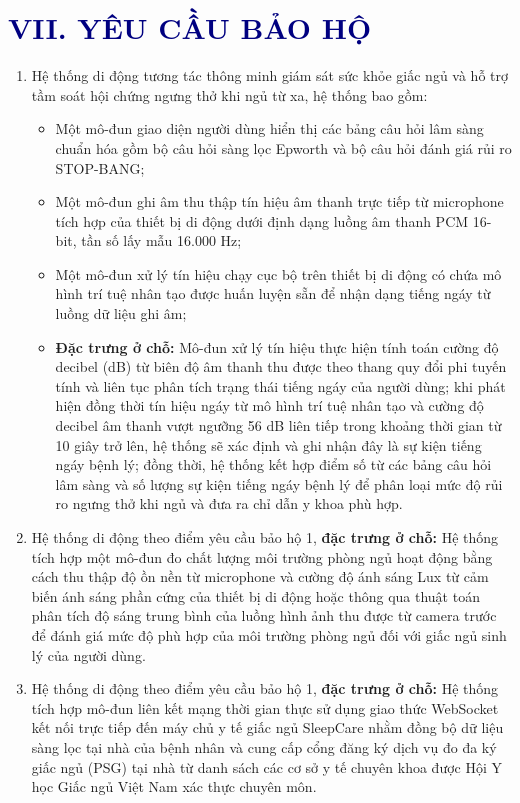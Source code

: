 \documentclass[12pt,a4paper]{article}
\begin{document}
\section{\textcolor{navy}{VII. YÊU CẦU BẢO HỘ}}

\begin{enumerate}
    \item Hệ thống di động tương tác thông minh giám sát sức khỏe giấc ngủ và hỗ trợ tầm soát hội chứng ngưng thở khi ngủ từ xa, hệ thống bao gồm:
    \begin{itemize}
        \item Một mô-đun giao diện người dùng hiển thị các bảng câu hỏi lâm sàng chuẩn hóa gồm bộ câu hỏi sàng lọc Epworth và bộ câu hỏi đánh giá rủi ro STOP-BANG;
        \item Một mô-đun ghi âm thu thập tín hiệu âm thanh trực tiếp từ microphone tích hợp của thiết bị di động dưới định dạng luồng âm thanh PCM 16-bit, tần số lấy mẫu 16.000 Hz;
        \item Một mô-đun xử lý tín hiệu chạy cục bộ trên thiết bị di động có chứa mô hình trí tuệ nhân tạo được huấn luyện sẵn để nhận dạng tiếng ngáy từ luồng dữ liệu ghi âm;
        \item \textbf{Đặc trưng ở chỗ:} Mô-đun xử lý tín hiệu thực hiện tính toán cường độ decibel (dB) từ biên độ âm thanh thu được theo thang quy đổi phi tuyến tính và liên tục phân tích trạng thái tiếng ngáy của người dùng; khi phát hiện đồng thời tín hiệu ngáy từ mô hình trí tuệ nhân tạo và cường độ decibel âm thanh vượt ngưỡng 56 dB liên tiếp trong khoảng thời gian từ 10 giây trở lên, hệ thống sẽ xác định và ghi nhận đây là sự kiện tiếng ngáy bệnh lý; đồng thời, hệ thống kết hợp điểm số từ các bảng câu hỏi lâm sàng và số lượng sự kiện tiếng ngáy bệnh lý để phân loại mức độ rủi ro ngưng thở khi ngủ và đưa ra chỉ dẫn y khoa phù hợp.
    \end{itemize}

    \item Hệ thống di động theo điểm yêu cầu bảo hộ 1, \textbf{đặc trưng ở chỗ:} Hệ thống tích hợp một mô-đun đo chất lượng môi trường phòng ngủ hoạt động bằng cách thu thập độ ồn nền từ microphone và cường độ ánh sáng Lux từ cảm biến ánh sáng phần cứng của thiết bị di động hoặc thông qua thuật toán phân tích độ sáng trung bình của luồng hình ảnh thu được từ camera trước để đánh giá mức độ phù hợp của môi trường phòng ngủ đối với giấc ngủ sinh lý của người dùng.

    \item Hệ thống di động theo điểm yêu cầu bảo hộ 1, \textbf{đặc trưng ở chỗ:} Hệ thống tích hợp mô-đun liên kết mạng thời gian thực sử dụng giao thức WebSocket kết nối trực tiếp đến máy chủ y tế giấc ngủ SleepCare nhằm đồng bộ dữ liệu sàng lọc tại nhà của bệnh nhân và cung cấp cổng đăng ký dịch vụ đo đa ký giấc ngủ (PSG) tại nhà từ danh sách các cơ sở y tế chuyên khoa được Hội Y học Giấc ngủ Việt Nam xác thực chuyên môn.


\end{enumerate}
\end{document}
